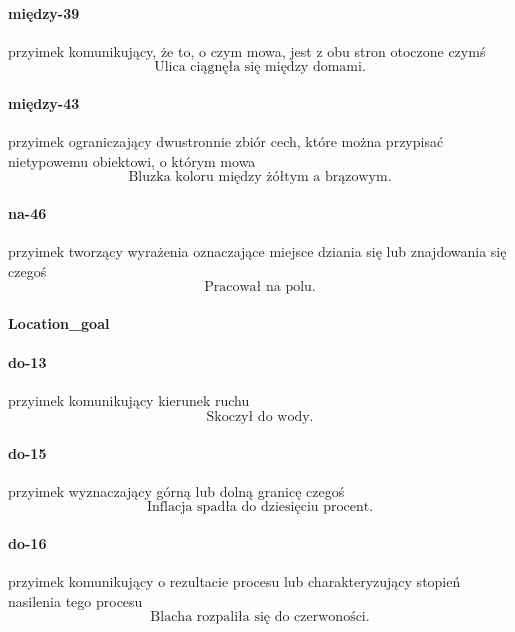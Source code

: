 \documentclass[a4paper, 12pt]{article}
\theoremstyle{remark}
\begin{document}
\paragraph{między-39} \label{prep-39}	przyimek komunikujący, że to, o czym mowa, jest z obu stron otoczone czymś
\begin{equation}
\text{Ulica ciągnęła się między domami.}
\end{equation}
\paragraph{między-43} \label{prep-43}	przyimek ograniczający dwustronnie zbiór cech, które można przypisać nietypowemu obiektowi, o którym mowa
\begin{equation}
\text{Bluzka koloru między żółtym a brązowym.}
\end{equation}
\paragraph{na-46} \label{prep-46}	przyimek tworzący wyrażenia oznaczające miejsce dziania się lub znajdowania się czegoś
\begin{equation}
\text{Pracował na polu.}
\end{equation}

\paragraph{Location\_goal} %
\label{sub:location_goal}
\paragraph{do-13} \label{prep-13}	przyimek komunikujący kierunek ruchu
\begin{equation}
\text{Skoczył do wody.}
\end{equation}
\paragraph{do-15} \label{prep-15}	przyimek wyznaczający górną lub dolną granicę czegoś
\begin{equation}
\text{Inflacja spadła do dziesięciu procent.}
\end{equation}
\paragraph{do-16} \label{prep-16}	przyimek komunikujący o rezultacie procesu lub charakteryzujący stopień nasilenia tego procesu
\begin{equation}
\text{Blacha rozpaliła się do czerwoności.}
\end{equation}
\end{document}
